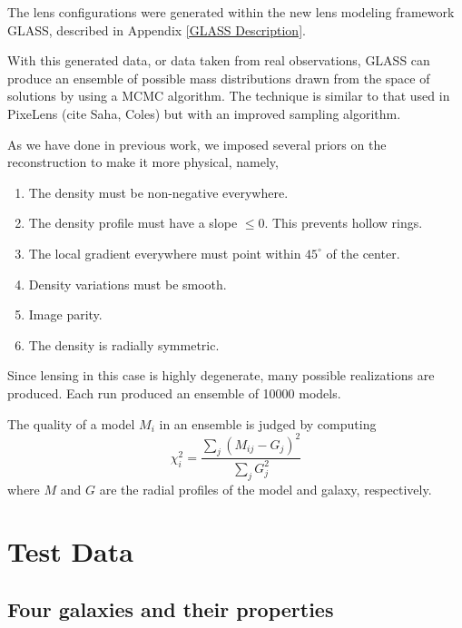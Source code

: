 \documentclass[onecolumn,galley]{mn2e}
\begin{document}
The lens configurations were generated within the new lens modeling framework
GLASS, described in Appendix \ref{GLASS Description}. 

With this generated data, or data taken from real observations, GLASS can produce
an ensemble of possible mass distributions drawn from the space of solutions by
using a MCMC algorithm.  The technique is similar to that used in PixeLens
(cite Saha, Coles) but with an improved sampling algorithm.

As we have done in previous work, we imposed several priors on the reconstruction to
make it more physical, namely,
%
\begin{enumerate}
\item The density must be non-negative everywhere.
\item The density profile must have a slope $\le 0$. This prevents hollow rings.
\item The local gradient everywhere must point within $45^{\circ}$ of the center.
\item Density variations must be smooth.
\item Image parity.
\item The density is radially symmetric.
\end{enumerate}
%
Since lensing in this case is highly degenerate, many possible realizations are
produced. Each run produced an ensemble of 10000 models.  

The quality of a model $M_i$ in an ensemble is judged by computing
\begin{equation}
\chi_i^2 = \frac{\sum_j (M_{ij} - G_j)^2}{\sum_j G_j^2}
\end{equation}
where $M$ and $G$ are the radial profiles of the model and galaxy, respectively.



\section{Test Data}

\subsection{Four galaxies and their properties} %
\end{document}
